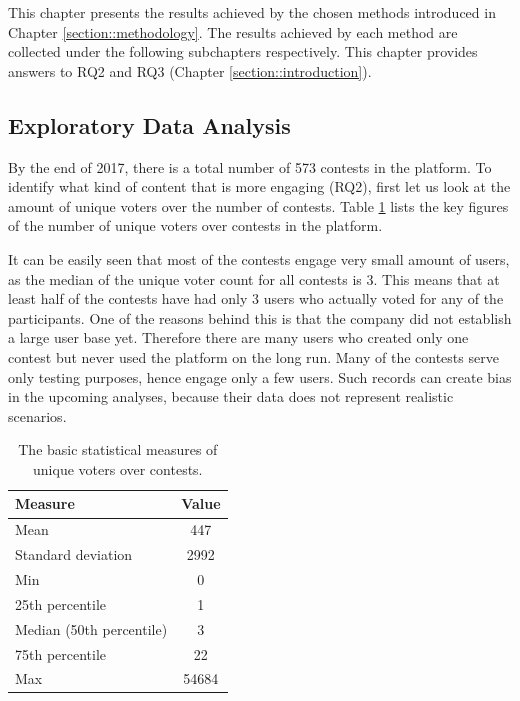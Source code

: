 This chapter presents the results achieved by the chosen methods introduced in Chapter \ref{section::methodology}. The results achieved by each method are collected under the following subchapters respectively. This chapter provides answers to RQ2 and RQ3 (Chapter \ref{section::introduction}).

\subsection{Exploratory Data Analysis}
\label{section::exploratory-data-analysis}
    By the end of 2017, there is a total number of 573 contests in the platform. To identify what kind of content that is more engaging (RQ2), first let us look at the amount of unique voters over the number of contests. Table \ref{user_engagement_in_contests} lists the key figures of the number of unique voters over contests in the platform. 

    It can be easily seen that most of the contests engage very small amount of users, as the median of the unique voter count for all contests is 3. This means that at least half of the contests have had only 3 users who actually voted for any of the participants. One of the reasons behind this is that the company did not establish a large user base yet. Therefore there are many users who created only one contest but never used the platform on the long run. Many of the contests serve only testing purposes, hence engage only a few users. Such records can create bias in the upcoming analyses, because their data does not represent realistic scenarios. 

    \begin{table}[H]
        \centering
        \begin{tabular}{l|c}
            \textbf{Measure} & \textbf{Value} \\
            \hline
            Mean & 447 \\
            Standard deviation & 2992 \\
            Min & 0 \\
            25th percentile & 1 \\
            Median (50th percentile) & 3 \\
            75th percentile & 22 \\
            Max & 54684
        \end{tabular}
        \caption{The basic statistical measures of unique voters over contests.}
        \label{user_engagement_in_contests}
    \end{table}
    

